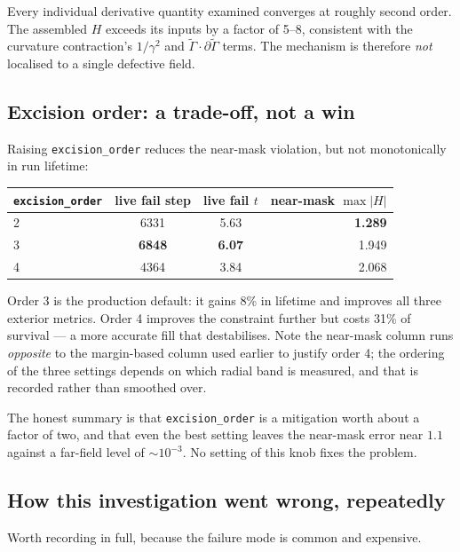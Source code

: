 Every individual derivative quantity examined converges at roughly second
order. The assembled $H$ exceeds its inputs by a factor of 5--8, consistent
with the curvature contraction's $1/\gamma^2$ and $\tilde{\Gamma}\cdot
\partial\tilde{\Gamma}$ terms. The mechanism is therefore \emph{not} localised
to a single defective field.

\subsection{Excision order: a trade-off, not a win}

Raising \texttt{excision\_order} reduces the near-mask violation, but not
monotonically in run lifetime:

\begin{center}
\begin{tabular}{@{}lccr@{}}
\toprule
\texttt{excision\_order} & live fail step & live fail $t$ & near-mask $\max|H|$ \\
\midrule
2 & 6331 & 5.63 & \textbf{1.289} \\
3 & \textbf{6848} & \textbf{6.07} & 1.949 \\
4 & 4364 & 3.84 & 2.068 \\
\bottomrule
\end{tabular}
\end{center}

Order 3 is the production default: it gains 8\% in lifetime and improves all
three exterior metrics. Order 4 improves the constraint further but costs
31\% of survival --- a more accurate fill that destabilises. Note the near-mask
column runs \emph{opposite} to the margin-based column used earlier to justify
order 4; the ordering of the three settings depends on which radial band is
measured, and that is recorded rather than smoothed over.

The honest summary is that \texttt{excision\_order} is a mitigation worth about
a factor of two, and that even the best setting leaves the near-mask error near
$1.1$ against a far-field level of $\sim10^{-3}$. No setting of this knob fixes
the problem.

\subsection{How this investigation went wrong, repeatedly}

Worth recording in full, because the failure mode is common and expensive.

